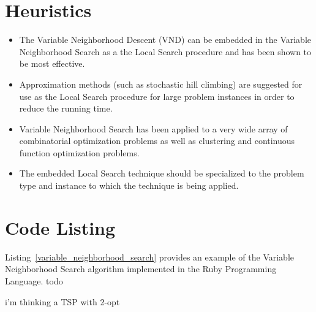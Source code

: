 \documentclass[a4paper, 11pt]{article}
\begin{document}
\section{Heuristics}
\label{sec:heuristics}
\begin{itemize}
	\item The Variable Neighborhood Descent (VND) can be embedded in the Variable Neighborhood Search as a the Local Search procedure and has been shown to be most effective. 
	\item Approximation methods (such as stochastic hill climbing) are suggested for use as the Local Search procedure for large problem instances in order to reduce the running time.
	\item Variable Neighborhood Search has been applied to a very wide array of combinatorial optimization problems as well as clustering and continuous function optimization problems.
	\item The embedded Local Search technique should be specialized to the problem type and instance to which the technique is being applied. 
\end{itemize}

\section{Code Listing}
\label{sec:code}
Listing~\ref{variable_neighborhood_search} provides an example of the Variable Neighborhood Search algorithm implemented in the Ruby Programming Language. 
todo

i'm thinking a TSP with 2-opt


\end{document}
